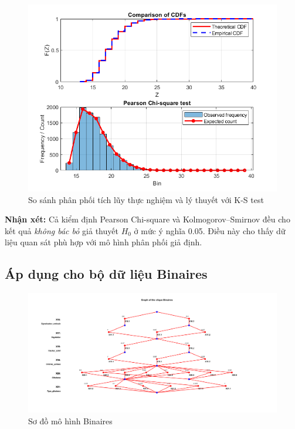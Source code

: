 \begin{figure}[h!]
    \centering
    \includegraphics[width=\textwidth]{../../assets/images/KS_fig_Singletons.png}
    \caption{So sánh phân phối tích lũy thực nghiệm và lý thuyết với K-S test}
    \label{fig:Sing_comparisonKS}
\end{figure}

\textbf{Nhận xét:}  
Cả kiểm định Pearson Chi-square và Kolmogorov--Smirnov đều cho kết quả \textit{không bác bỏ} giả thuyết $H_0$ ở mức ý nghĩa 0.05. Điều này cho thấy dữ liệu quan sát phù hợp với mô hình phân phối giả định.

\subsection{Áp dụng cho bộ dữ liệu Binaires}

\begin{figure}[h!]
    \centering
    \includegraphics[width=1.2\linewidth]{../../assets/images/fig_Binaires.png}
    \caption{Sơ đồ mô hình Binaires}
    \label{fig:Binaires}
\end{figure}

